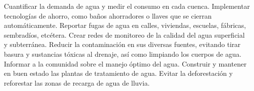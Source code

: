 {\begin{parts}
\begin{checkboxes}
    \choice Cuantificar la demanda de agua y medir el consumo en cada cuenca.
    \CorrectChoice Implementar tecnologías de ahorro, como baños ahorradores o llaves que se cierran automáticamente.
    \CorrectChoice Reportar fugas de agua en calles, viviendas, escuelas, fábricas, sembradíos, etcétera.
    \choice Crear redes de monitoreo de la calidad del agua superficial y subterránea.
    \CorrectChoice Reducir la contaminación en sus diversas fuentes, evitando tirar basura y sustancias tóxicas al drenaje, así como limpiando los cuerpos de agua.
    \choice Informar a la comunidad sobre el manejo óptimo del agua.
    \choice Construir y mantener en buen estado las plantas de tratamiento de agua.
    \CorrectChoice Evitar la deforestación y reforestar las zonas de recarga de agua de lluvia.
\end{checkboxes}
\end{parts}


}




